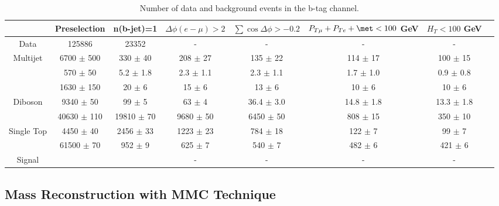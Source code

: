 \begin{table}
  \centering
   \begin{footnotesize}	
  \begin{tabular}{cccccccc}
    \hline\hline
	& Preselection			&	n(b-jet)=1			&	$\Delta\phi(e-\mu)>2$			&	$\sum\cos\Delta\phi > -0.2$			&	$P_{T\mu} + P_{Te} + \met < 100$ GeV			&	$ H_T < 100$ GeV					\\
   \hline
Data	&	125886			&	23352			&	-			&	-			&	-			&	-						\\
Multijet	&	6700	$\pm$	500	&	330	$\pm$	40	&	208	$\pm$	27	&	135	$\pm$	22	&	114	$\pm$	17	&	100	$\pm$	15	\\
\Zll 	&	570	$\pm$	50	&	5.2	$\pm$	1.8	&	2.3	$\pm$	1.1	&	2.3	$\pm$	1.1	&	1.7	$\pm$	1.0	&	0.9	$\pm$	0.8		\\
\Wlnu	&	1630	$\pm$	150	&	20	$\pm$	6	&	15	$\pm$	6	&	13	$\pm$	6	&	10	$\pm$	6	&	10	$\pm$	6		\\
Diboson	&	9340	$\pm$	50	&	99	$\pm$	5	&	63	$\pm$	4	&	36.4	$\pm$	3.0	&	14.8	$\pm$	1.8	&	13.3	$\pm$	1.8		\\
\ttbar	&	40630	$\pm$	110	&	19810	$\pm$	70	&	9680	$\pm$	50	&	6450	$\pm$	50	&	808	$\pm$	15	&	350	$\pm$	10		\\
Single Top	&	4450	$\pm$	40	&	2456	$\pm$	33	&	1223	$\pm$	23	&	784	$\pm$	18	&	122	$\pm$	7	&	99	$\pm$	7		\\
\Ztautau	&	61500	$\pm$	70	&	952	$\pm$	9	&	625	$\pm$	7	&	540	$\pm$	7	&	482	$\pm$	6	&	421	$\pm$	6		\\
Signal	&				&				&	-			&	-			&	-			&	-						\\
    \hline
    \hline
  \end{tabular}
  \caption{Number of data and background events in the b-tag channel.}
  \label{tab:eventsel:btag}
   \end{footnotesize}	
\end{table}

\subsection{Mass Reconstruction with MMC Technique}\label{sec:mmc}

